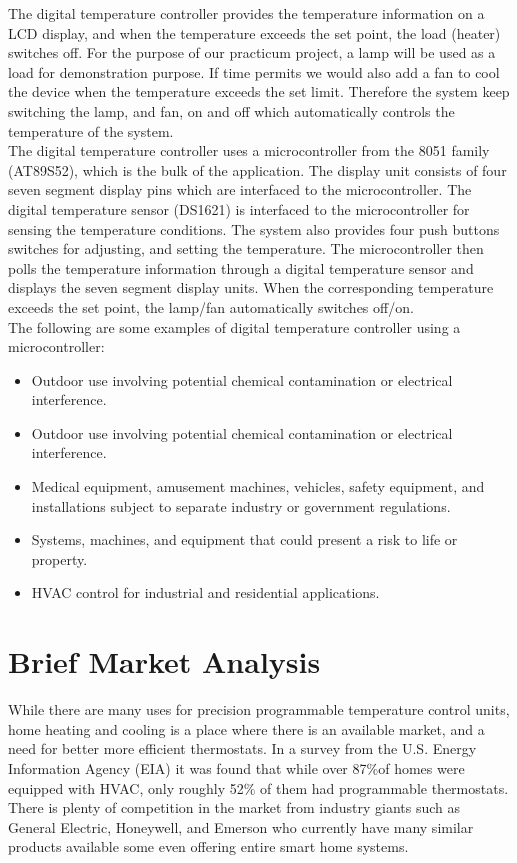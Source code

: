 \documentclass[11pt]{article}
\begin{document}
The digital temperature controller provides the temperature information on a LCD display, and when the temperature exceeds the set point, the load (heater) switches off. For the purpose of our practicum project, a lamp will be used as a load for demonstration purpose. If time permits we would also add a fan to cool the device when the temperature exceeds the set limit. Therefore the system keep switching the lamp, and fan, on and off which automatically controls the temperature of the system.\\

The digital temperature controller uses a microcontroller from the 8051 family (AT89S52), which is the bulk of the application. The display unit consists of four seven segment display pins which are interfaced to the microcontroller. The digital temperature sensor (DS1621) is interfaced to the microcontroller for sensing the temperature conditions. The system also provides four push buttons switches for adjusting, and setting the temperature. The microcontroller then polls the temperature information through a digital temperature sensor and displays the seven segment display units. When the corresponding temperature exceeds the set point, the lamp/fan automatically switches off/on.\\

The following are some examples of digital temperature controller using a microcontroller:
\begin{itemize}
    \item Outdoor use involving potential chemical contamination or electrical interference.
    \item Outdoor use involving potential chemical contamination or electrical interference.
    \item Medical equipment, amusement machines, vehicles, safety equipment, and installations subject to separate industry or government regulations.
    \item Systems, machines, and equipment that could present a risk to life or property.
    \item HVAC control for industrial and residential applications.
\end{itemize}

\pagebreak

\section*{Brief Market Analysis} 

While there are many uses for precision programmable temperature control units, home heating and cooling is a place where there is an available market, and a need for better more efficient thermostats. In a survey from the U.S. Energy Information Agency (EIA) it was found that while over 87$\%$of homes were equipped with HVAC, only roughly 52$\%$ of them had programmable thermostats. There is plenty of competition in the market from industry giants such as General Electric, Honeywell, and Emerson who currently have many similar products available some even offering entire smart home systems.\\
\end{document}
